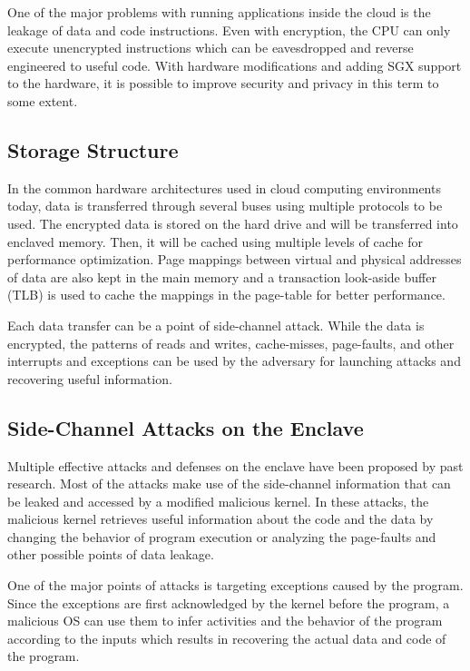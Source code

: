 One of the major problems with running applications inside the cloud is the leakage of data and code instructions. Even with encryption, the CPU can only execute unencrypted instructions which can be eavesdropped and reverse engineered to useful code. With hardware modifications and adding SGX support to the hardware, it is possible to improve security and privacy in this term to some extent.

\subsection{Storage Structure}

In the common hardware architectures used in cloud computing environments today, data is transferred through several buses using multiple protocols to be used. The encrypted data is stored on the hard drive and will be transferred into enclaved memory. Then, it will be cached using multiple levels of cache for performance optimization. Page mappings between virtual and physical addresses of data are also kept in the main memory and a transaction look-aside buffer (TLB) is used to cache the mappings in the page-table for better performance.

Each data transfer can be a point of side-channel attack. While the data is encrypted, the patterns of reads and writes, cache-misses, page-faults, and other interrupts and exceptions can be used by the adversary for launching attacks and recovering useful information.

\subsection{Side-Channel Attacks on the Enclave}

Multiple effective attacks and defenses on the enclave have been proposed by past research. Most of the attacks make use of the side-channel information that can be leaked and accessed by a modified malicious kernel. In these attacks, the malicious kernel retrieves useful information about the code and the data by changing the behavior of program execution or analyzing the page-faults and other possible points of data leakage.

One of the major points of attacks is targeting exceptions caused by the program. Since the exceptions are first acknowledged by the kernel before the program, a malicious OS can use them to infer activities and the behavior of the program according to the inputs which results in recovering the actual data and code of the program.

